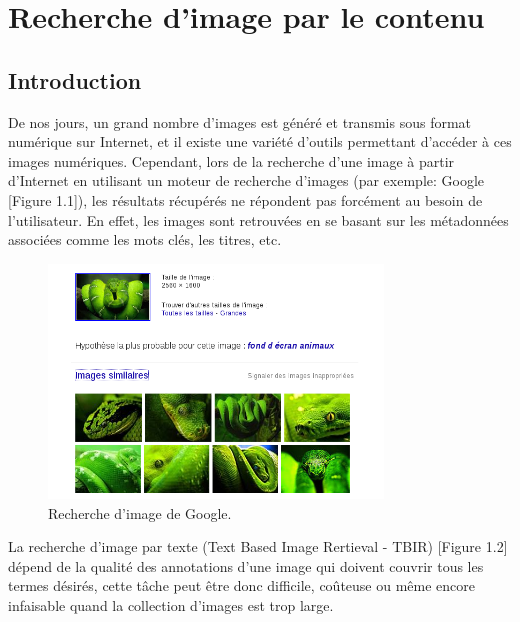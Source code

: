 
\chapter{Recherche d'image par le contenu} %




\section{Introduction}

	De nos jours, un grand nombre d'images est généré et transmis sous format numérique sur Internet, et il existe une variété d'outils permettant d'accéder à ces images numériques. Cependant, lors de la recherche d'une image à partir d'Internet en utilisant un moteur de recherche d'images (par exemple: Google [Figure 1.1]), les résultats récupérés ne répondent pas forcément au besoin de l'utilisateur. En effet, les images sont retrouvées en se basant sur les métadonnées associées comme les mots clés, les titres, etc.
	
	
\begin{figure}[H]
	\centering
		\includegraphics[width=3.5in]{Figures/googleImage2.png}
	\caption[An Electron]{Recherche d'image de Google.}
	\label{fig:Electron}
\end{figure}

	La recherche d'image par texte (Text Based Image Rertieval - TBIR) [Figure 1.2] dépend de la qualité des annotations d'une image qui doivent couvrir tous les termes désirés, cette tâche peut être donc difficile, coûteuse ou même encore infaisable quand la collection d'images est trop large.
	
